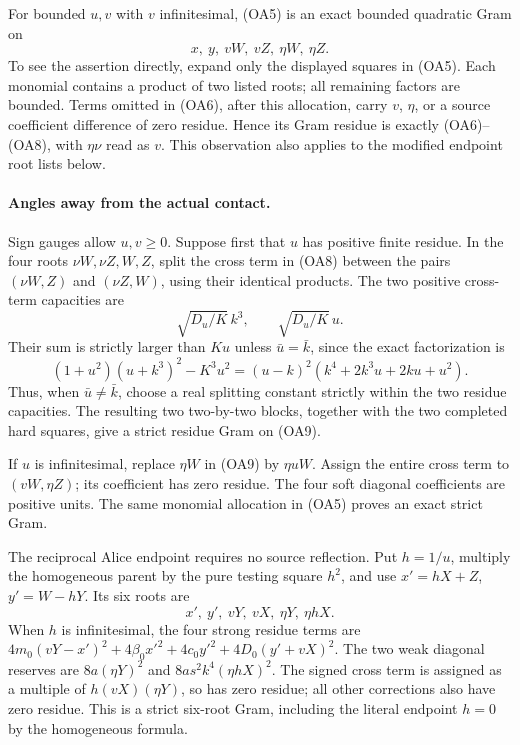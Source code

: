 For bounded $u,v$ with $v$ infinitesimal, (OA5) is an exact bounded
quadratic Gram on
\[
                 x,\ y,\ vW,\ vZ,\ \eta W,\ \eta Z.    \tag{OA9}
\]
To see the assertion directly, expand only the displayed squares in
(OA5). Each monomial contains a product of two listed roots; all
remaining factors are bounded. Terms omitted in (OA6), after this
allocation, carry $v$, $\eta$, or a source coefficient difference of
zero residue. Hence its Gram residue is exactly (OA6)--(OA8), with
$\eta\nu$ read as $v$. This observation also applies to the modified
endpoint root lists below.

\paragraph{Angles away from the actual contact.}
Sign gauges allow $u,v\geq0$. Suppose first that $u$ has positive
finite residue. In the four roots
$\nu W,\nu Z,W,Z$, split the cross term in (OA8) between the pairs
$(\nu W,Z)$ and $(\nu Z,W)$, using their identical products.
The two positive cross-term capacities are
\[
 \sqrt{D_u/K}\,k^3,\qquad \sqrt{D_u/K}\,u.
\]
Their sum is strictly larger than $Ku$ unless $\bar u=\bar k$, since
the exact factorization is
\[
 (1+u^2)(u+k^3)^2-K^3u^2
  =(u-k)^2(k^4+2k^3u+2ku+u^2).                         \tag{OA10}
\]
Thus, when $\bar u\ne\bar k$, choose a real splitting constant
strictly within the two residue capacities. The resulting two
two-by-two blocks, together with the two completed hard squares,
give a strict residue Gram on (OA9).

If $u$ is infinitesimal, replace $\eta W$ in (OA9) by $\eta uW$.
Assign the entire cross term to $(vW,\eta Z)$; its coefficient has
zero residue. The four soft diagonal coefficients are positive units.
The same monomial allocation in (OA5) proves an exact strict Gram.

The reciprocal Alice endpoint requires no source reflection. Put
$h=1/u$, multiply the homogeneous parent by the pure testing square
$h^2$, and use $x'=hX+Z$, $y'=W-hY$. Its six roots are
\[
                 x',\ y',\ vY,\ vX,\ \eta Y,\ \eta hX.
                                                        \tag{OA11}
\]
When $h$ is infinitesimal, the four strong residue terms are
$4m_0(vY-x')^2+4\beta_0x'^2+4c_0y'^2+4D_0(y'+vX)^2$.
The two weak diagonal reserves are $8a(\eta Y)^2$ and
$8as^2k^4(\eta hX)^2$. The signed cross term is assigned as a
multiple of $h(vX)(\eta Y)$, so has zero residue; all other corrections
also have zero residue. This is a strict six-root Gram, including
the literal endpoint $h=0$ by the homogeneous formula.

